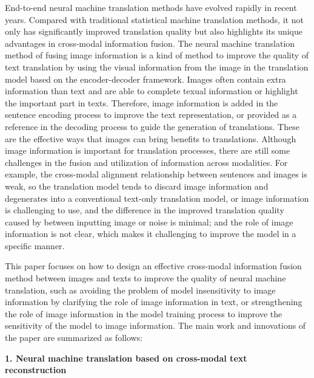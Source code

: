 End-to-end neural machine translation methods have evolved rapidly in recent years. Compared with traditional statistical machine translation methods, it not only has significantly improved translation quality but also highlights its unique advantages in cross-modal information fusion. The neural machine translation method of fusing image information is a kind of method to improve the quality of text translation by using the visual information from the image in the translation model based on the encoder-decoder framework. Images often contain extra information than text and are able to complete texual information or highlight the important part in texts. Therefore, image information is added in the sentence encoding process to improve the text representation, or provided as a reference in the decoding process to guide the generation of translations. These are the effective ways that images can bring benefits to translations. Although image information is important for translation processes, there are still some challenges in the fusion and utilization of information across modalities. 
For example, the cross-modal alignment relationship between sentences and images is weak, so the translation model tends to discard image information and degenerates into a conventional text-only translation model, or image information is challenging to use, and the difference in the improved translation quality caused by between inputting image or noise is minimal; and the role of image information is not clear, which makes it challenging to improve the model in a specific manner.

This paper focuses on how to design an effective cross-modal information fusion method between images and texts to improve the quality of neural machine translation, such as avoiding the problem of model insensitivity to image information by clarifying the role of image information in text, or strengthening the role of image information in the model training process to improve the sensitivity of the model to image information. The main work and innovations of the paper are summarized as follows:

\textbf{1. Neural machine translation based on cross-modal text reconstruction}

